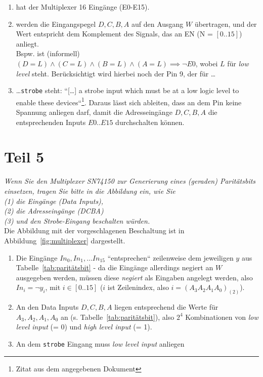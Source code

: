 \begin{enumerate}
    \itemsep0.5em
    \item hat der Multiplexer 16 Eingänge (E0-E15).
    \item werden die Eingangspegel $D, C, B, A$ auf den Ausgang $W$ übertragen, und der Wert entspricht dem Komplement des Signals, das an EN (N = $[0..15]$) anliegt. \\
    Bspw. ist (informell) $(D = L) \land (C = L) \land (B = L) \land (A = L) \implies \neg E0$, wobei $L$ für \textit{low level} steht. Berücksichtigt wird hierbei noch der Pin 9, der für \ldots
    \item \ldots \texttt{strobe} steht: ``[\ldots] a strobe input which must be at a low logic level to enable these devices``\footnote{
        Zitat aus dem angegebenen Dokument
    }.
    Daraus lässt sich ableiten, dass an dem Pin keine Spannung anliegen darf, damit die Adresseingänge $D, C, B, A$ die entsprechenden Inputs $E0..E15$ durchschalten können.
\end{enumerate}

\section{Teil 5}

\textit{Wenn Sie den Multiplexer SN74150 zur Generierung eines (geraden)
Paritätsbits einsetzen, tragen Sie bitte in die Abbildung ein, wie Sie\\
(1) die Eingänge (Data Inputs),\\
(2) die Adresseingänge (DCBA)\\
(3) und den Strobe-Eingang beschalten würden.}\\

\noindent
Die Abbildung mit der vorgeschlagenen Beschaltung ist in Abbildung~\ref{fig:multiplexer} dargestellt.

\begin{enumerate}
    \itemsep0.5em
    \item Die Eingänge $In_0, In_1, \ldots In_{15}$ ``entsprechen`` zeilenweise dem jeweiligen $y$ aus Tabelle~\ref{tab:paritätsbit} -
    da die Eingänge allerdings negiert an $W$ ausgegeben werden, müssen diese \textit{negiert} als Eingaben angelegt werden, also
     $In_i = \neg y_i$, mit $i \in [0..15]$ ($i$ ist Zeilenindex, also $i = (A_3 A_2 A_1 A_0)_{(2)}$).
    \item An den Data Inputs $D, C, B, A$  liegen entsprechend die Werte für $A_3, A_2, A_1, A_0$ an (s. Tabelle~\ref{tab:paritätsbit}), also $2^4$ Kombinationen von \textit{low level input} (= 0) und \textit{high level input} (= 1).
    \item An dem \texttt{strobe} Eingang muss \textit{low level input} anliegen
\end{enumerate}

